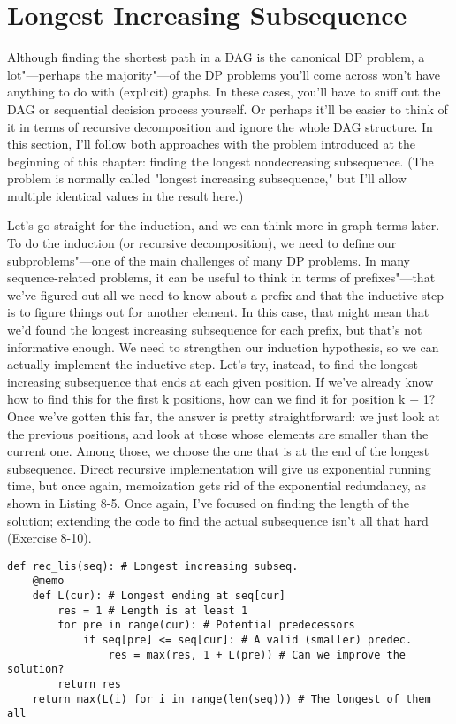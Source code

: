\section{Longest Increasing Subsequence}
Although finding the shortest path in a DAG is the canonical DP problem, a lot"---perhaps the majority"---of the DP problems you'll come across won't have anything to do with (explicit)  graphs. In these cases, you'll have to sniff out the DAG or sequential decision process yourself. Or perhaps it'll be easier to think of it in terms of recursive decomposition and ignore the whole DAG structure. In this section, I'll follow both approaches with the problem introduced at the beginning of this chapter: finding the longest nondecreasing subsequence. (The problem is normally called "longest increasing subsequence," but I'll allow multiple identical values in the result here.)

Let's go straight for the induction, and we can think more in graph terms later. To do the induction (or recursive decomposition), we need to define our subproblems"---one of the main challenges of many DP problems. In many sequence-related problems, it can be useful to think in terms of prefixes"---that we've figured out all we need to know about a prefix and that the inductive step is to figure things out for another element. In this case, that might mean that we'd found the longest increasing subsequence for each prefix, but that's not informative enough. We need to strengthen our induction hypothesis, so we can actually implement the inductive step. Let's try, instead, to find the longest increasing subsequence that ends at each given position.
If we've already know how to find this for the first k positions, how can we find it for position k + 1?
Once we've gotten this far, the answer is pretty straightforward: we just look at the previous positions, and look at those whose elements are smaller than the current one. Among those, we choose the one that is at the end of the longest subsequence. Direct recursive implementation will give us exponential running time, but once again, memoization gets rid of the exponential redundancy, as shown in Listing 8-5. Once again, I've focused on finding the length of the solution; extending the code to find the actual subsequence isn't all that hard (Exercise 8-10).

\begin{lstlisting}[caption={A Memoized Recursive Solution to the Longest Increasing Subsequence Problem}]
def rec_lis(seq): # Longest increasing subseq.
    @memo
    def L(cur): # Longest ending at seq[cur]
        res = 1 # Length is at least 1
        for pre in range(cur): # Potential predecessors
            if seq[pre] <= seq[cur]: # A valid (smaller) predec.
                res = max(res, 1 + L(pre)) # Can we improve the solution?
        return res
    return max(L(i) for i in range(len(seq))) # The longest of them all
\end{lstlisting}

